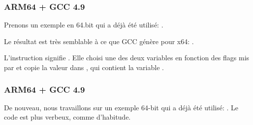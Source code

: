 \subsubsection{ARM64 + GCC 4.9 \Optimizing}

Prenons un exemple en 64.bit qui a déjà été utilisé: .



Le résultat est très semblable à ce que GCC génère pour x64: .

L'instruction \CSEL signifie .
Elle choisi une des deux variables en fonction des flags mis par \TST et copie la
valeur dans , qui contient la variable .

\subsubsection{ARM64 + GCC 4.9 \NonOptimizing}

De nouveau, nous travaillons sur un exemple 64-bit qui a déjà été utilisé: .
Le code est plus verbeux, comme d'habitude.



